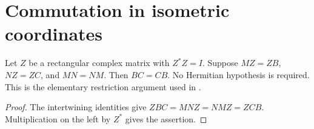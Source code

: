 \section{Commutation in isometric coordinates}
\label{sec:isometric_intertwining_commute}

\begin{theorem}
\label{thm:isometric_intertwining_commute}
\leanok
Let $Z$ be a rectangular complex matrix with $Z^*Z=I$. Suppose
$MZ=ZB$, $NZ=ZC$, and $MN=NM$. Then $BC=CB$.
No Hermitian hypothesis is required. This is the elementary restriction
argument used in \cite[Section~7, lines~268--276]{OpenAI2026AreaLaw}.
\end{theorem}
\begin{proof}
\leanok
The intertwining identities give $ZBC=MNZ=NMZ=ZCB$.
Multiplication on the left by $Z^*$ gives the assertion.
\end{proof}
